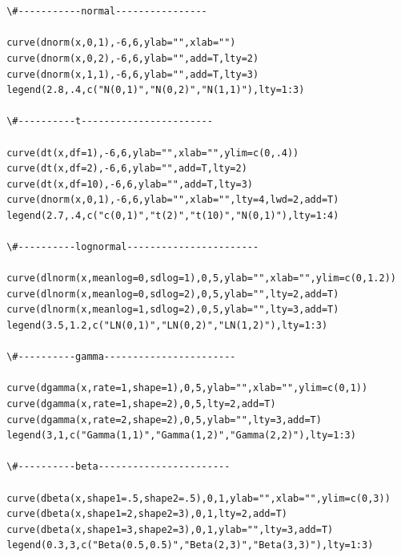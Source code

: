 \chapter{}
\begin{LTR}
\begin{verbatim}
 \#-----------normal----------------
 
 curve(dnorm(x,0,1),-6,6,ylab="",xlab="")
 curve(dnorm(x,0,2),-6,6,ylab="",add=T,lty=2)
 curve(dnorm(x,1,1),-6,6,ylab="",add=T,lty=3)
 legend(2.8,.4,c("N(0,1)","N(0,2)","N(1,1)"),lty=1:3)

 \#----------t-----------------------

 curve(dt(x,df=1),-6,6,ylab="",xlab="",ylim=c(0,.4))
 curve(dt(x,df=2),-6,6,ylab="",add=T,lty=2)
 curve(dt(x,df=10),-6,6,ylab="",add=T,lty=3)
 curve(dnorm(x,0,1),-6,6,ylab="",xlab="",lty=4,lwd=2,add=T)
 legend(2.7,.4,c("c(0,1)","t(2)","t(10)","N(0,1)"),lty=1:4)

 \#----------lognormal-----------------------
 
 curve(dlnorm(x,meanlog=0,sdlog=1),0,5,ylab="",xlab="",ylim=c(0,1.2))
 curve(dlnorm(x,meanlog=0,sdlog=2),0,5,ylab="",lty=2,add=T)
 curve(dlnorm(x,meanlog=1,sdlog=2),0,5,ylab="",lty=3,add=T)
 legend(3.5,1.2,c("LN(0,1)","LN(0,2)","LN(1,2)"),lty=1:3)

 \#----------gamma-----------------------
 
 curve(dgamma(x,rate=1,shape=1),0,5,ylab="",xlab="",ylim=c(0,1))
 curve(dgamma(x,rate=1,shape=2),0,5,lty=2,add=T)
 curve(dgamma(x,rate=2,shape=2),0,5,ylab="",lty=3,add=T)
 legend(3,1,c("Gamma(1,1)","Gamma(1,2)","Gamma(2,2)"),lty=1:3)

 \#----------beta-----------------------
 
 curve(dbeta(x,shape1=.5,shape2=.5),0,1,ylab="",xlab="",ylim=c(0,3))
 curve(dbeta(x,shape1=2,shape2=3),0,1,lty=2,add=T)
 curve(dbeta(x,shape1=3,shape2=3),0,1,ylab="",lty=3,add=T)
 legend(0.3,3,c("Beta(0.5,0.5)","Beta(2,3)","Beta(3,3)"),lty=1:3)
\end{verbatim}
\end{LTR}